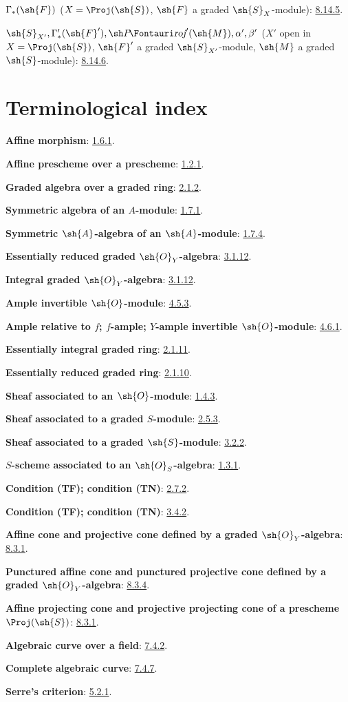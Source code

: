 $\Gamma_*(\sh{F})$
($X=\Proj(\sh{S})$, $\sh{F}$ a graded $\sh{S}_X$-module): \hyperref[II.8.14.5]{8.14.5}.

$\sh{S}_{X'},\Gamma'_*(\sh{F}'),\shProj'(\sh{M}),
\alpha',\beta'$
($X'$ open in $X=\Proj(\sh{S})$, $\sh{F}'$ a graded
$\sh{S}_{X'}$-module, $\sh{M}$ a graded $\sh{S}$-module): \hyperref[II.8.14.6]{8.14.6}.

\endgroup

\clearpage
{}
{}
\section*{Terminological index}

\begingroup
\small
\setlength{\parindent}{0pt}
\setlength{\parskip}{2pt}
\newcommand{\egaTerm}[2]{\textbf{#1}: #2.\par}

\egaTerm{Affine morphism}{\hyperref[II.1.6.1]{1.6.1}}
\egaTerm{Affine prescheme over a prescheme}{\hyperref[II.1.2.1]{1.2.1}}
\egaTerm{Graded algebra over a graded ring}{\hyperref[II.2.1.2]{2.1.2}}
\egaTerm{Symmetric algebra of an $A$-module}{\hyperref[II.1.7.1]{1.7.1}}
\egaTerm{Symmetric $\sh{A}$-algebra of an $\sh{A}$-module}{\hyperref[II.1.7.4]{1.7.4}}
\egaTerm{Essentially reduced graded $\sh{O}_Y$-algebra}{\hyperref[II.3.1.12]{3.1.12}}
\egaTerm{Integral graded $\sh{O}_Y$-algebra}{\hyperref[II.3.1.12]{3.1.12}}
\egaTerm{Ample invertible $\sh{O}$-module}{\hyperref[II.4.5.3]{4.5.3}}
\egaTerm{Ample relative to $f$; $f$-ample; $Y$-ample
invertible $\sh{O}$-module}{\hyperref[II.4.6.1]{4.6.1}}
\egaTerm{Essentially integral graded ring}{\hyperref[II.2.1.11]{2.1.11}}
\egaTerm{Essentially reduced graded ring}{\hyperref[II.2.1.10]{2.1.10}}
\egaTerm{Sheaf associated to an $\sh{O}$-module}{\hyperref[II.1.4.3]{1.4.3}}
\egaTerm{Sheaf associated to a graded $S$-module}{\hyperref[II.2.5.3]{2.5.3}}
\egaTerm{Sheaf associated to a graded $\sh{S}$-module}{\hyperref[II.3.2.2]{3.2.2}}
\egaTerm{$S$-scheme associated to an $\sh{O}_S$-algebra}{\hyperref[II.1.3.1]{1.3.1}}

\egaTerm{Condition (TF); condition (TN)}{\hyperref[II.2.7.2]{2.7.2}}
\egaTerm{Condition (TF); condition (TN)}{\hyperref[II.3.4.2]{3.4.2}}
\egaTerm{Affine cone and projective cone defined by a graded
$\sh{O}_Y$-algebra}{\hyperref[II.8.3.1]{8.3.1}}
\egaTerm{Punctured affine cone and punctured projective cone defined by
a graded $\sh{O}_Y$-algebra}{\hyperref[II.8.3.4]{8.3.4}}
\egaTerm{Affine projecting cone and projective projecting cone of a
prescheme $\Proj(\sh{S})$}{\hyperref[II.8.3.1]{8.3.1}}
\egaTerm{Algebraic curve over a field}{\hyperref[II.7.4.2]{7.4.2}}
\egaTerm{Complete algebraic curve}{\hyperref[II.7.4.7]{7.4.7}}
\egaTerm{Serre's criterion}{\hyperref[II.5.2.1]{5.2.1}}

